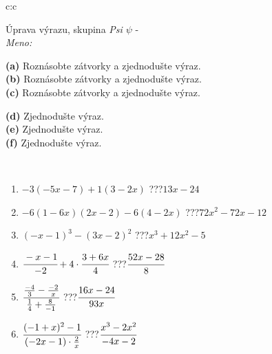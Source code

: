 \documentclass[10pt]{report}
\begin{document}
\newpage
\thispagestyle{empty}
\begin{tabular}{c:c}
\begin{minipage}[c][104.5mm][t]{0.5\linewidth}
\begin{center}
\vspace{7mm}
{\huge Úprava výrazu, skupina \textit{Psi $\psi$} -}\\[5mm]
\textit{Meno:}\phantom{xxxxxxxxxxxxxxxxxxxxxxxxxxxxxxxxxxxxxxxxxxxxxxxxxxxxxxxxxxxxxxxxx}\\[5mm]
\begin{minipage}{0.95\linewidth}
\begin{center}
{\small \begin{minipage}{0.6\textwidth}
\textbf{(a)} Roznásobte zátvorky a zjednodušte výraz. \\[1mm]
\textbf{(b)} Roznásobte zátvorky a zjednodušte výraz. \\[1mm]
\textbf{(c)} Roznásobte zátvorky a zjednodušte výraz.
\end{minipage} \begin{minipage}{0.39\textwidth}
\textbf{(d)} Zjednodušte výraz. \\[1mm]
\textbf{(e)} Zjednodušte výraz. \\[1mm]
\textbf{(f)} Zjednodušte výraz.
\end{minipage}
}
\end{center}
\end{minipage}
\\[4mm]
\begin{minipage}{0.79\linewidth}
\begin{center}
\begin{varwidth}{\linewidth}
\begin{enumerate}
\normalsize
\item $-3(-5x-7)+1(3-2x)$\quad \dotfill\; ???\;\dotfill \quad $13x-24$
\item $-6(1-6x)(2x-2)-6(4-2x)$\quad \dotfill\; ???\;\dotfill \quad $72x^2-72x-12$
\item $(-x-1)^3-(3x-2)^2$\quad \dotfill\; ???\;\dotfill \quad $x^3+12x^2-5$
\item $\cfrac{-x-1}{-2}+4\cdot\cfrac{3+6x}{4}$\quad \dotfill\; ???\;\dotfill \quad $\cfrac{52x-28}{8}$
\item $\cfrac{\frac{-4}{3}-\frac{-2}{x}}{\frac{1}{4}+\frac{8}{-1}}$\quad \dotfill\; ???\;\dotfill \quad $\cfrac{16x-24}{93x}$
\item $\cfrac{(-1+x)^2-1}{(-2x-1)\cdot\frac{2}{x}}$\quad \dotfill\; ???\;\dotfill \quad $\cfrac{x^3-2x^2}{-4x-2}$

\end{enumerate}
\end{varwidth}
\end{center}
\end{minipage}
\end{center}
\end{minipage}
\end{tabular}
\end{document}
